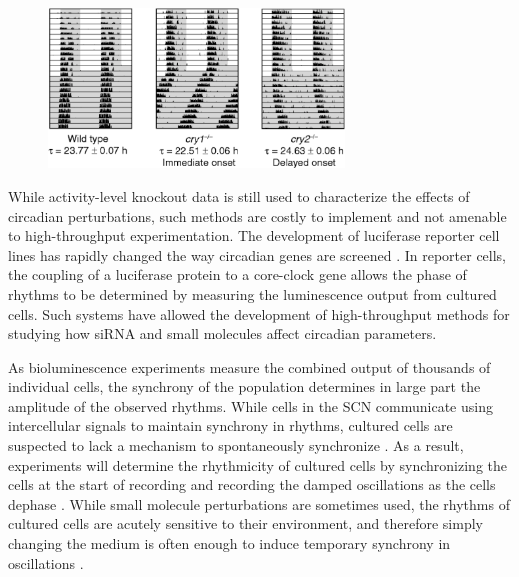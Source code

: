\begin{figure}[tbp]
  \centering
  \includegraphics[width=0.7\textwidth]{chap1/figures/vanderhorst.png}
  \label{fig:vanderhorst}
\end{figure}

While activity-level knockout data is still used to characterize the effects of circadian perturbations, such methods are costly to implement and not amenable to high-throughput experimentation.
The development of luciferase reporter cell lines has rapidly changed the way circadian genes are screened \cite{Yoo2004}.
In reporter cells, the coupling of a luciferase protein to a core-clock gene allows the phase of rhythms to be determined by measuring the luminescence output from cultured cells.
Such systems have allowed the development of high-throughput methods for studying how siRNA \cite{Zhang2009} and small molecules \cite{Hirota2008} affect circadian parameters.

As bioluminescence experiments measure the combined output of thousands of individual cells, the synchrony of the population determines in large part the amplitude of the observed rhythms.
While cells in the SCN communicate using intercellular signals to maintain synchrony in rhythms, cultured cells are suspected to lack a mechanism to spontaneously synchronize \cite{Noguchi2013}.
As a result, experiments will determine the rhythmicity of cultured cells by synchronizing the cells at the start of recording and recording the damped oscillations as the cells dephase \cite{Welsh2004}.
While small molecule perturbations are sometimes used, the rhythms of cultured cells are acutely sensitive to their environment, and therefore simply changing the medium is often enough to induce temporary synchrony in oscillations \cite{Izumo2006}.


